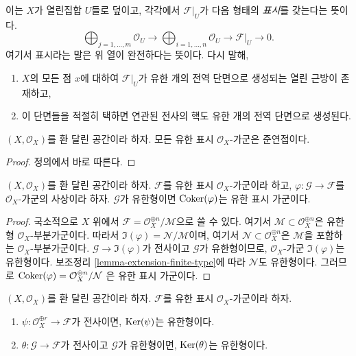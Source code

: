 \noindent
이는 $X$가 열린집합 $U$들로 덮이고, 각각에서 $\mathcal{F}|_U$가
다음 형태의 {\it 표시}를 갖는다는 뜻이다.
$$
\bigoplus\nolimits_{j = 1, \ldots, m}
\mathcal{O}_U
\longrightarrow
\bigoplus\nolimits_{i = 1, \ldots, n}
\mathcal{O}_U
\to
\mathcal{F}|_U
\to
0.
$$
여기서 표시라는 말은 위 열이 완전하다는 뜻이다. 다시 말해,
\begin{enumerate}
\item $X$의 모든 점 $x$에 대하여 $\mathcal{F}|_U$가 유한 개의
전역 단면으로 생성되는 열린 근방이 존재하고,
\item 이 단면들을 적절히 택하면 연관된 전사의 핵도
유한 개의 전역 단면으로 생성된다.
\end{enumerate}

\begin{lemma}
\label{lemma-finite-presentation-quasi-coherent}
$(X, \mathcal{O}_X)$를 환 달린 공간이라 하자.
모든 유한 표시 $\mathcal{O}_X$-가군은 준연접이다.
\end{lemma}

\begin{proof}
정의에서 바로 따른다.
\end{proof}

\begin{lemma}
\label{lemma-cokernel-finite-finite-presentation}
$(X,\mathcal{O}_X)$를 환 달린 공간이라 하자.
$\mathcal{F}$를 유한 표시 $\mathcal{O}_X$-가군이라 하고,
$\varphi : \mathcal{G} \to \mathcal{F}$를 $\mathcal{O}_X$-가군의
사상이라 하자. $\mathcal{G}$가 유한형이면
$\mathop{\mathrm{Coker}}(\varphi)$는 유한 표시 가군이다.
\end{lemma}

\begin{proof}
국소적으로 $X$ 위에서
$\mathcal{F} = \mathcal{O}_X^{\oplus n} / \mathcal{M}$으로 쓸 수 있다.
여기서 $\mathcal{M} \subset \mathcal{O}_X^{\oplus n}$은
유한형 $\mathcal{O}_X$-부분가군이다. 따라서
$\Im(\varphi) = \mathcal{N} / \mathcal{M}$이며, 여기서
$\mathcal{N} \subset \mathcal{O}_X^{\oplus n}$은 $\mathcal{M}$을 포함하는
$\mathcal{O}_X$-부분가군이다.
$\mathcal{G} \to \Im(\varphi)$가 전사이고 $\mathcal{G}$가 유한형이므로,
$\mathcal{O}_X$-가군 $\Im(\varphi)$는 유한형이다.
보조정리 \ref{lemma-extension-finite-type}에 따라 $\mathcal{N}$도 유한형이다.
그러므로
$\mathop{\mathrm{Coker}}(\varphi) = \mathcal{O}_X^{\oplus n} / \mathcal{N}$
은 유한 표시 가군이다.
\end{proof}

\begin{lemma}
\label{lemma-kernel-surjection-finite-free-onto-finite-presentation}
$(X, \mathcal{O}_X)$를 환 달린 공간이라 하자.
$\mathcal{F}$를 유한 표시 $\mathcal{O}_X$-가군이라 하자.
\begin{enumerate}
\item $\psi : \mathcal{O}_X^{\oplus r} \to \mathcal{F}$가 전사이면,
$\mathop{\mathrm{Ker}}(\psi)$는 유한형이다.
\item $\theta : \mathcal{G} \to \mathcal{F}$가 전사이고
$\mathcal{G}$가 유한형이면, $\mathop{\mathrm{Ker}}(\theta)$는 유한형이다.
\end{enumerate}
\end{lemma}

